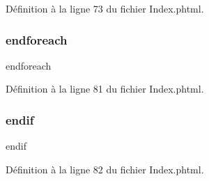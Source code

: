 Définition à la ligne 73 du fichier Index.\+phtml.

\mbox{\label{_index_8phtml_a672d9707ef91db026c210f98cc601123}} 
\subsubsection{\texorpdfstring{endforeach}{endforeach}}
{\footnotesize\ttfamily endforeach}



Définition à la ligne 81 du fichier Index.\+phtml.

\mbox{\label{_index_8phtml_a82cd33ca97ff99f2fcc5e9c81d65251b}} 
\subsubsection{\texorpdfstring{endif}{endif}}
{\footnotesize\ttfamily endif}



Définition à la ligne 82 du fichier Index.\+phtml.

